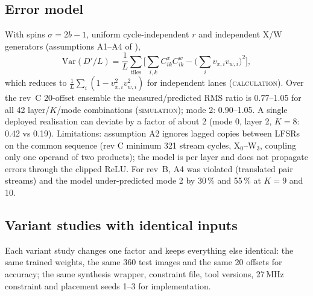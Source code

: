 \documentclass[10pt,a4paper]{article}
\newcommand{\lbl}[1]{\textsc{#1}}          %
\newcommand{\Dp}{D'}                      %
\DeclareRobustCommand{\file}{\path}   %
\begin{document}
\subsection{Error model}
With spins $\sigma=2b-1$, uniform cycle-independent $r$ and independent X/W
generators (assumptions A1--A4 of \file{reports/sw/error_model.md}),
\begin{equation}
\mathrm{Var}(\Dp/L)=\frac1L\sum_{\text{tiles}}\Big[\sum_{i,k}C^x_{ik}C^w_{ik}-\Big(\sum_iv_{x,i}v_{w,i}\Big)^2\Big],
\label{eq:var2}
\end{equation}
which reduces to $\frac1L\sum_i(1-v_{x,i}^2v_{w,i}^2)$ for independent lanes
(\lbl{calculation}). Over the rev~C 20-offset ensemble the measured/predicted
RMS ratio is 0.77--1.05 for all 42 layer/$K$/mode combinations
(\lbl{simulation}); mode 2: 0.90--1.05. A single deployed realisation can
deviate by a factor of about 2 (mode 0, layer 2, $K=8$: 0.42 vs 0.19).
Limitations: assumption A2 ignores lagged copies between LFSRs on the common
sequence (rev C minimum 321 stream cycles, X$_0$--W$_3$, coupling only one
operand of two products); the model is per layer and does not propagate
errors through the clipped ReLU. For rev~B, A4 was violated (translated pair
streams) and the model under-predicted mode 2 by 30\,\% and 55\,\% at $K=9$
and 10.

\subsection{Variant studies with identical inputs}
Each variant study changes one factor and keeps everything else identical:
the same trained weights, the same 360 test images and the same 20 offsets
for accuracy; the same synthesis wrapper, constraint file, tool versions,
27\,MHz constraint and placement seeds 1--3 for implementation.
\end{document}
